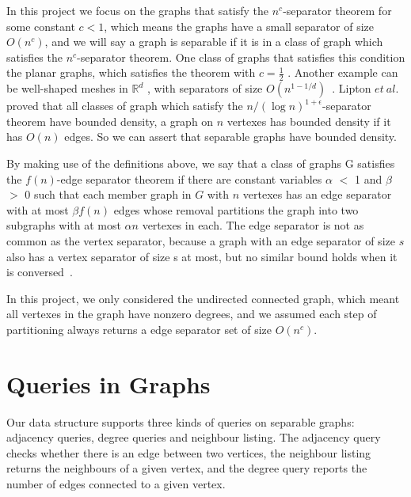 \documentclass[12pt,glossary]{dalthesis}
\begin{document}
\bigskip
\bigskip

In this project we focus on the graphs that satisfy the $n^{c}$-separator theorem for some constant $c < 1$, which means the graphs have a small separator of size $O(n^{c})$, and we will say a graph is separable if it is in a class of graph which satisfies the $n^{c}$-separator theorem. One class of graphs that satisfies this condition the planar graphs, which satisfies the theorem with $c = \frac{1}{2}$ . Another example can be well-shaped meshes in $\mathbb{R}^{d}$ , with separators of size $O(n^{1-1/d})$~\cite{ separators-sphere-packing}.  Lipton $et \ al$.~\cite{Nested-Dissection} proved that all classes of graph which satisfy the $n/(\log n )^{1+\epsilon}$-separator theorem have bounded density, a graph on $n$ vertexes has bounded density if it has $O(n)$ edges. So we can assert that separable graphs have bounded density.

\bigskip
\bigskip

By making use of the definitions above, we say that a class of graphs G satisfies the $f(n)$-edge separator theorem if there are constant variables $\alpha$ $<$ 1 and $\beta$ $>$ 0 such that each member graph in $G$ with $n$ vertexes has an edge separator with at most $\beta f(n)$ edges whose removal partitions the graph into two subgraphs with at most $\alpha n$ vertexes in each. The edge separator is not as common as the vertex separator, because a graph with an edge separator of size $s$ also has a vertex separator of size s at most, but no similar bound holds when it is conversed~\cite{compact-representation}.

\bigskip
\bigskip

In this project, we only considered the undirected connected graph, which meant all vertexes in the graph have nonzero degrees, and we assumed each step of partitioning always returns a edge separator set of size $O(n^{c})$.

\bigskip
\bigskip

\section{Queries in Graphs}
Our data structure supports three kinds of queries on separable graphs: adjacency queries, degree queries and neighbour listing. The adjacency query checks whether there is an edge between two vertices, the neighbour listing returns the neighbours of a given vertex, and the degree query reports the number of edges connected to a given vertex.
\end{document}
